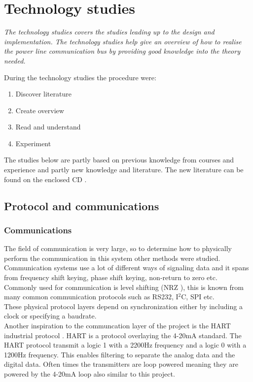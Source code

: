 \chapter{Technology studies}

\textit{The technology studies covers the studies leading up to the design and implementation. The technology studies help give an overview of how to realise the power line communication bus by providing good knowledge into the theory needed.}

During the technology studies the procedure were:
\begin{enumerate}
\item Discover literature
\item Create overview
\item Read and understand
\item Experiment
\end{enumerate}
The studies below are partly based on previous knowledge from courses and experience and partly new knowledge and literature. The new literature can be found on the enclosed CD \cite{cd}.

\section{Protocol and communications}
\subsection{Communications}
The field of communication is very large, so to determine how to physically perform the communication in this system other methods were studied.\\
Communication systems use a lot of different ways of signaling data and it spans from frequency shift keying, phase shift keying, non-return to zero etc.
Commonly used for communication is level shifting (NRZ \citep{WikipediaNRZ}), this is known from many common communication protocols such as RS232, I$^2$C, SPI etc.\\
These physical protocol layers depend on synchronization either by including a clock or specifying a baudrate.\\
Another inspiration to the communcation layer of the project is the HART industrial protocol \cite{HART}. HART is a protocol overlaying the 4-20mA standard. The HART protocol transmit a logic 1 with a 2200Hz frequency and a logic 0 with a 1200Hz frequency. This enables filtering to separate the analog data and the digital data. Often times the transmitters are loop powered meaning they are powered by the 4-20mA loop also similar to this project.

